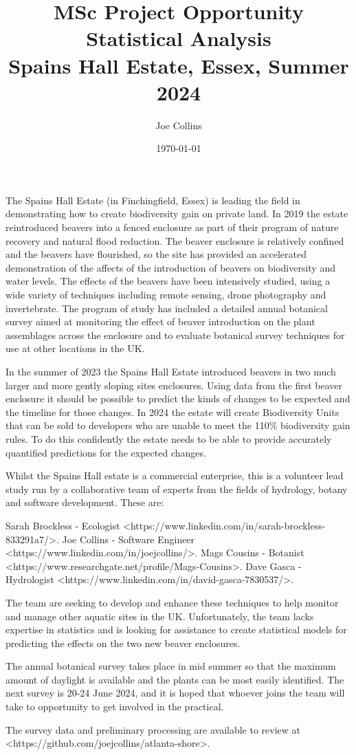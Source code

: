 \documentclass[12pt]{article}
\title{MSc Project Opportunity\\ Statistical Analysis \\
  \Large Spains Hall Estate, Essex, Summer 2024}
\author{Joe Collins}
\date{\today}
\begin{document}
\maketitle

The Spains Hall Estate
(in Finchingfield, Essex)
is leading the field in demonstrating
how to create biodiversity gain on private land.
In 2019 the estate reintroduced beavers into a fenced enclosure
as part of their program of nature recovery and natural flood reduction.
The beaver enclosure is relatively confined
and the beavers have flourished,
so the site has provided an accelerated demonstration of the affects of the introduction of beavers
on biodiversity and water levels.
The effects of the beavers have been intensively studied,
using a wide variety of techniques including remote sensing, drone photography and invertebrate.
The program of study has included a detailed annual botanical survey
aimed at monitoring the effect of beaver introduction on the plant assemblages across the enclosure
and to evaluate botanical survey techniques for use at other locations in the UK.

In the summer of 2023 the Spains Hall Estate
introduced beavers in two much larger and more gently sloping sites enclosures.
Using data from the first beaver enclosure
it should be possible to predict the kinds of changes to be expected and the timeline for those changes.
In 2024 the estate will create Biodiversity Units that can be sold to developers 
who are unable to meet the 110\% biodiversity gain rules.
To do this confidently the estate needs to be able to 
provide accurately quantified predictions for the expected changes.

Whilst the Spains Hall estate is a commercial enterprise,
this is a volunteer lead study
run by a collaborative team of experts from the fields of hydrology, botany and software development.
These are:

Sarah Brockless - Ecologist <https://www.linkedin.com/in/sarah-brockless-833291a7/>.
Joe Collins - Software Engineer <https://www.linkedin.com/in/joejcollins/>.
Mags Cousins - Botanist <https://www.researchgate.net/profile/Mags-Cousins>.
Dave Gasca - Hydrologist <https://www.linkedin.com/in/david-gasca-7830537/>.

The team are seeking to develop and enhance these techniques
to help monitor and manage other aquatic sites in the UK.
Unfortunately, the team lacks expertise in statistics
and is looking for assistance to create statistical models for predicting the effects
on the two new beaver enclosures.

The annual botanical survey takes place in mid summer
so that the maximum amount of daylight is available
and the plants can be most easily identified.
The next survey is 20-24 June 2024,
and it is hoped that whoever joins the team
will take to opportunity to get involved in the practical.

The survey data and preliminary processing are available
to review at <https://github.com/joejcollins/atlanta-shore>.
\end{document}
